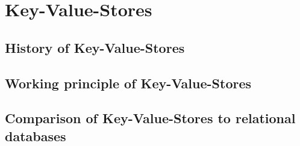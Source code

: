 
\section{Key-Value-Stores}
\todo{}
\subsection{History of Key-Value-Stores}
\subsection{Working principle of Key-Value-Stores}
\todo{}
\subsection{Comparison of Key-Value-Stores to relational databases}
\todo{}
